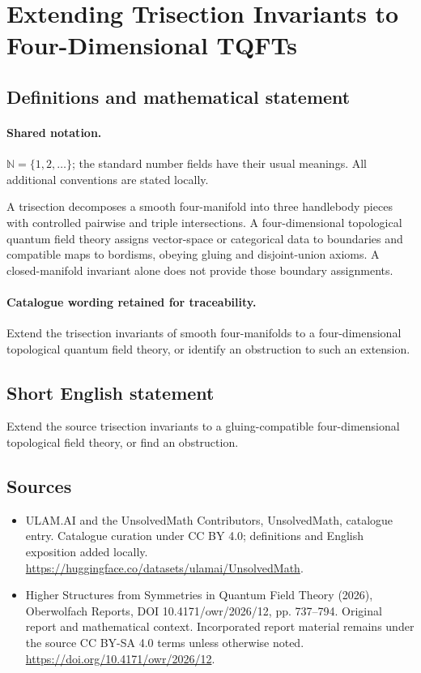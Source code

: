 \documentclass[11pt]{article}
\begin{document}
\section{Extending Trisection Invariants to Four-Dimensional TQFTs}\label{statement}

\subsection{Definitions and mathematical statement}

\paragraph{Shared notation.}$\mathbb N=\{1,2,\ldots\}$; the standard number fields have their usual meanings. All additional conventions are stated locally.


A trisection decomposes a smooth four-manifold into three handlebody pieces with controlled pairwise and triple intersections. A four-dimensional topological quantum field theory assigns vector-space or categorical data to boundaries and compatible maps to bordisms, obeying gluing and disjoint-union axioms. A closed-manifold invariant alone does not provide those boundary assignments.

\paragraph{Catalogue wording retained for traceability.}
Extend the trisection invariants of smooth four-manifolds to a four-dimensional topological quantum field theory, or identify an obstruction to such an extension.
\subsection{Short English statement}
Extend the source trisection invariants to a gluing-compatible four-dimensional topological field theory, or find an obstruction.
\subsection{Sources}
\begin{itemize}
\item[\hypertarget{source:statement:1}{S1}] ULAM.AI and the UnsolvedMath Contributors, UnsolvedMath, catalogue entry. Catalogue curation under CC BY 4.0; definitions and English exposition added locally.
\url{https://huggingface.co/datasets/ulamai/UnsolvedMath}.
\item[\hypertarget{source:statement:2}{S2}] Higher Structures from Symmetries in Quantum Field Theory (2026), Oberwolfach Reports, DOI 10.4171/owr/2026/12, pp. 737--794. Original report and mathematical context. Incorporated report material remains under the source CC BY-SA 4.0 terms unless otherwise noted.
\url{https://doi.org/10.4171/owr/2026/12}.
\end{itemize}
\label{end:statement}
\end{document}
